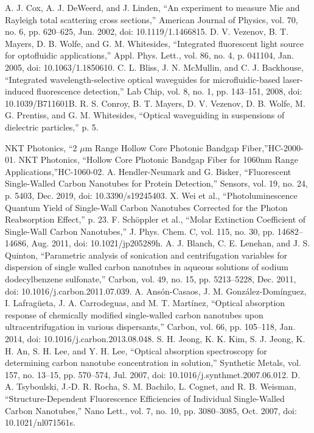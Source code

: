 \begin{thebibliography}{99}
A. J. Cox, A. J. DeWeerd, and J. Linden, “An experiment to measure Mie and Rayleigh total scattering cross sections,” American Journal of Physics, vol. 70, no. 6, pp. 620–625, Jun. 2002, doi: 10.1119/1.1466815.
D. V. Vezenov, B. T. Mayers, D. B. Wolfe, and G. M. Whitesides, “Integrated fluorescent light source for optofluidic applications,” Appl. Phys. Lett., vol. 86, no. 4, p. 041104, Jan. 2005, doi: 10.1063/1.1850610.
C. L. Bliss, J. N. McMullin, and C. J. Backhouse, “Integrated wavelength-selective optical waveguides for microfluidic-based laser-induced fluorescence detection,” Lab Chip, vol. 8, no. 1, pp. 143–151, 2008, doi: 10.1039/B711601B.
R. S. Conroy, B. T. Mayers, D. V. Vezenov, D. B. Wolfe, M. G. Prentiss, and G. M. Whitesides, “Optical waveguiding in suspensions of dielectric particles,” p. 5.

NKT Photonics, “2 $\mu$m Range Hollow Core Photonic Bandgap Fiber,”HC-2000-01.
NKT Photonics, “Hollow Core Photonic Bandgap Fiber for 1060nm Range Applications,”HC-1060-02.
A. Hendler-Neumark and G. Bisker, “Fluorescent Single-Walled Carbon Nanotubes for Protein Detection,” Sensors, vol. 19, no. 24, p. 5403, Dec. 2019, doi: 10.3390/s19245403.
 X. Wei et al., “Photoluminescence Quantum Yield of Single-Wall Carbon Nanotubes Corrected for the Photon Reabsorption Effect,” p. 23.
 F. Schöppler et al., “Molar Extinction Coefficient of Single-Wall Carbon Nanotubes,” J. Phys. Chem. C, vol. 115, no. 30, pp. 14682–14686, Aug. 2011, doi: 10.1021/jp205289h.
 A. J. Blanch, C. E. Lenehan, and J. S. Quinton, “Parametric analysis of sonication and centrifugation variables for dispersion of single walled carbon nanotubes in aqueous solutions of sodium dodecylbenzene sulfonate,” Carbon, vol. 49, no. 15, pp. 5213–5228, Dec. 2011, doi: 10.1016/j.carbon.2011.07.039.
 A. Ansón-Casaos, J. M. González-Domínguez, I. Lafragüeta, J. A. Carrodeguas, and M. T. Martínez, “Optical absorption response of chemically modified single-walled carbon nanotubes upon ultracentrifugation in various dispersants,” Carbon, vol. 66, pp. 105–118, Jan. 2014, doi: 10.1016/j.carbon.2013.08.048.
S. H. Jeong, K. K. Kim, S. J. Jeong, K. H. An, S. H. Lee, and Y. H. Lee, “Optical absorption spectroscopy for determining carbon nanotube concentration in solution,” Synthetic Metals, vol. 157, no. 13–15, pp. 570–574, Jul. 2007, doi: 10.1016/j.synthmet.2007.06.012.
 D. A. Tsyboulski, J.-D. R. Rocha, S. M. Bachilo, L. Cognet, and R. B. Weisman, “Structure-Dependent Fluorescence Efficiencies of Individual Single-Walled Carbon Nanotubes,” Nano Lett., vol. 7, no. 10, pp. 3080–3085, Oct. 2007, doi: 10.1021/nl071561s.



\end{thebibliography}
